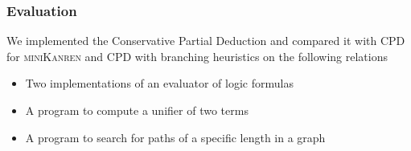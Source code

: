 \documentclass[xcolor=table]{beamer}
\newcommand{\mk}{\textsc{miniKanren}\xspace}
\begin{document}
\begin{frame}[fragile]
  \frametitle{Evaluation}
We implemented the Conservative Partial Deduction and compared it with CPD for \mk and CPD with branching heuristics on the following relations

\begin{itemize}
  \item Two implementations of an evaluator of logic formulas
  \item A program to compute a unifier of two terms
  \item A program to search for paths of a specific length in a graph
\end{itemize}
\end{frame}

%          
\end{document}
